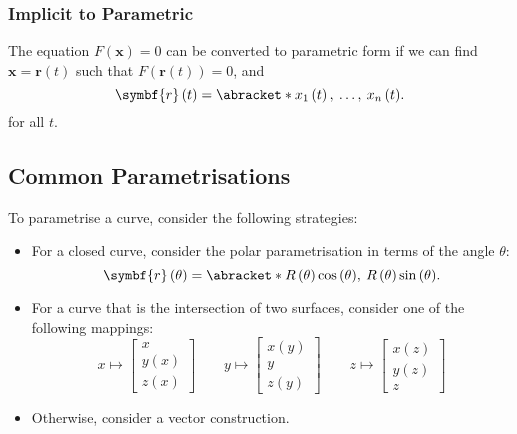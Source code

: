 \documentclass{article}
\begin{document}
\subsubsection{Implicit to Parametric}
The equation \(F\left( \symbf{x} \right) = 0\) can be converted to
parametric form if we can find \(\symbf{x} = \symbf{r}\left( t
\right)\) such that \(F\left( \symbf{r}\left( t \right) \right) = 0\),
and
\begin{equation*}
    \symbf{r}\left( t \right) = \abracket*{x_1\left( t \right),\: \dots,\: x_n\left( t \right)}.
\end{equation*}
for all \(t\).
\subsection{Common Parametrisations}
To parametrise a curve, consider the following strategies:
\begin{itemize}
    \item For a closed curve, consider the polar parametrisation in
          terms of the angle \(\theta\):
          \begin{equation*}
              \symbf{r}\left( \theta \right) = \abracket*{R\left( \theta \right) \cos{\left( \theta \right)},\: R\left( \theta \right) \sin{\left( \theta \right)}}.
          \end{equation*}
    \item For a curve that is the intersection of two surfaces,
          consider one of the following mappings:
          \begin{equation*}
              x \mapsto
              \begin{bmatrix}
                  x                 \\
                  y\left( x \right) \\
                  z\left( x \right)
              \end{bmatrix}
              \qquad
              y \mapsto
              \begin{bmatrix}
                  x\left( y \right) \\
                  y                 \\
                  z\left( y \right)
              \end{bmatrix}
              \qquad
              z \mapsto
              \begin{bmatrix}
                  x\left( z \right) \\
                  y\left( z \right) \\
                  z
              \end{bmatrix}
          \end{equation*}
    \item Otherwise, consider a vector construction.
\end{itemize}
\end{document}
